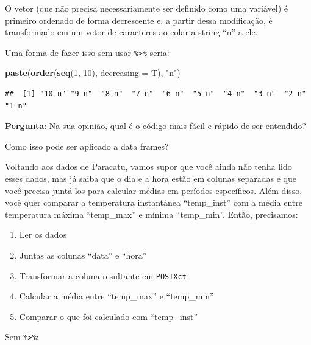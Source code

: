 \documentclass[]{book}
\newenvironment{Shaded}{\begin{snugshade}}{\end{snugshade}}
\newcommand{\KeywordTok}[1]{\textcolor[rgb]{0.13,0.29,0.53}{\textbf{#1}}}
\newcommand{\DataTypeTok}[1]{\textcolor[rgb]{0.13,0.29,0.53}{#1}}
\newcommand{\DecValTok}[1]{\textcolor[rgb]{0.00,0.00,0.81}{#1}}
\newcommand{\StringTok}[1]{\textcolor[rgb]{0.31,0.60,0.02}{#1}}
\newcommand{\NormalTok}[1]{#1}
\providecommand{\tightlist}{%
  \setlength{\itemsep}{0pt}\setlength{\parskip}{0pt}}
\theoremstyle{definition}
\theoremstyle{definition}
\theoremstyle{definition}
\theoremstyle{remark}
\begin{document}
O vetor (que não precisa necessariamente ser definido como uma variável)
é primeiro ordenado de forma decrescente e, a partir dessa modificação,
é transformado em um vetor de caracteres ao colar a string ``n'' a ele.

Uma forma de fazer isso sem usar \texttt{\%\textgreater{}\%} seria:

\begin{Shaded}
\begin{Highlighting}[]
\KeywordTok{paste}\NormalTok{(}\KeywordTok{order}\NormalTok{(}\KeywordTok{seq}\NormalTok{(}\DecValTok{1}\NormalTok{, }\DecValTok{10}\NormalTok{), }\DataTypeTok{decreasing =}\NormalTok{ T), }\StringTok{"n"}\NormalTok{)}
\end{Highlighting}
\end{Shaded}

\begin{verbatim}
##  [1] "10 n" "9 n"  "8 n"  "7 n"  "6 n"  "5 n"  "4 n"  "3 n"  "2 n"  "1 n"
\end{verbatim}

{\textbf{Pergunta}: Na sua opinião, qual é o código mais fácil e rápido
de ser entendido?}

Como isso pode ser aplicado a data frames?

Voltando aos dados de Paracatu, vamos supor que você ainda não tenha
lido esses dados, mas já saiba que o dia e a hora estão em colunas
separadas e que você precisa juntá-los para calcular médias em períodos
específicos. Além disso, você quer comparar a temperatura instantânea
``temp\_inst'' com a média entre temperatura máxima ``temp\_max'' e
mínima ``temp\_min''. Então, precisamos:

\begin{enumerate}
\def\labelenumi{\arabic{enumi}.}
\tightlist
\item
  Ler os dados\\
\item
  Juntas as colunas ``data'' e ``hora''\\
\item
  Transformar a coluna resultante em \texttt{POSIXct}\\
\item
  Calcular a média entre ``temp\_max'' e ``temp\_min''\\
\item
  Comparar o que foi calculado com ``temp\_inst''
\end{enumerate}

Sem \texttt{\%\textgreater{}\%}:
\end{document}
